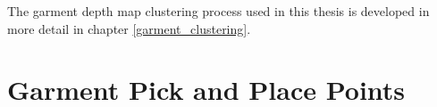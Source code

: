 The garment depth map clustering process used in this thesis is developed in more detail in chapter \ref{garment_clustering}.

\section{Garment Pick and Place Points}
\label{garment_PnP_points}





